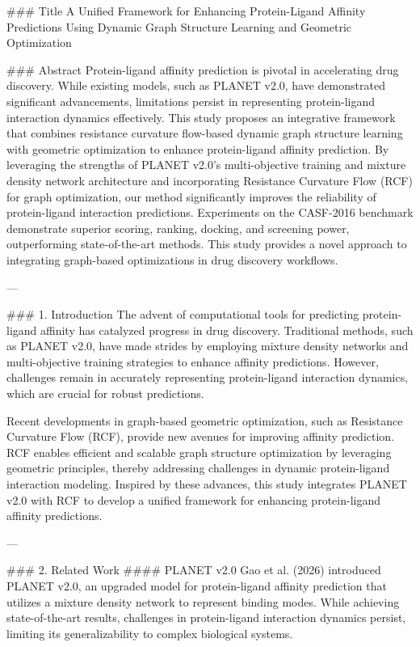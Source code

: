 ### Title  
A Unified Framework for Enhancing Protein-Ligand Affinity Predictions Using Dynamic Graph Structure Learning and Geometric Optimization  

### Abstract  
Protein-ligand affinity prediction is pivotal in accelerating drug discovery. While existing models, such as PLANET v2.0, have demonstrated significant advancements, limitations persist in representing protein-ligand interaction dynamics effectively. This study proposes an integrative framework that combines resistance curvature flow-based dynamic graph structure learning with geometric optimization to enhance protein-ligand affinity prediction. By leveraging the strengths of PLANET v2.0's multi-objective training and mixture density network architecture and incorporating Resistance Curvature Flow (RCF) for graph optimization, our method significantly improves the reliability of protein-ligand interaction predictions. Experiments on the CASF-2016 benchmark demonstrate superior scoring, ranking, docking, and screening power, outperforming state-of-the-art methods. This study provides a novel approach to integrating graph-based optimizations in drug discovery workflows.  

---

### 1. Introduction  
The advent of computational tools for predicting protein-ligand affinity has catalyzed progress in drug discovery. Traditional methods, such as PLANET v2.0, have made strides by employing mixture density networks and multi-objective training strategies to enhance affinity predictions. However, challenges remain in accurately representing protein-ligand interaction dynamics, which are crucial for robust predictions.  

Recent developments in graph-based geometric optimization, such as Resistance Curvature Flow (RCF), provide new avenues for improving affinity prediction. RCF enables efficient and scalable graph structure optimization by leveraging geometric principles, thereby addressing challenges in dynamic protein-ligand interaction modeling. Inspired by these advances, this study integrates PLANET v2.0 with RCF to develop a unified framework for enhancing protein-ligand affinity predictions.  

---

### 2. Related Work  
#### PLANET v2.0  
Gao et al. (2026) introduced PLANET v2.0, an upgraded model for protein-ligand affinity prediction that utilizes a mixture density network to represent binding modes. While achieving state-of-the-art results, challenges in protein-ligand interaction dynamics persist, limiting its generalizability to complex biological systems.  

